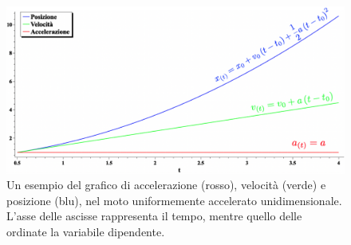\begin{figure}[htbp]
    \begin{center}
        \includegraphics[width=13cm]{images/Motorettunifacc1.png} 
        \caption{Un esempio del grafico di accelerazione (rosso), velocità
        (verde) e posizione (blu), nel moto uniformemente accelerato
        unidimensionale. L'asse delle ascisse rappresenta il tempo,
        mentre quello delle ordinate la variabile dipendente.}       
    \end{center}
\label{fig:MRUA}
\end{figure}